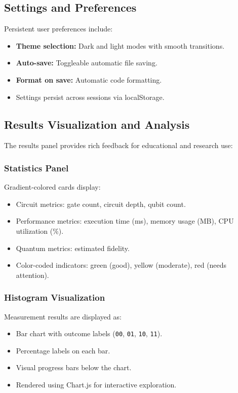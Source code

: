 \documentclass[conference]{IEEEtran}
\begin{document}
\subsection{Settings and Preferences}

Persistent user preferences include:
\begin{itemize}
    \item \textbf{Theme selection:} Dark and light modes with smooth transitions.
    \item \textbf{Auto-save:} Toggleable automatic file saving.
    \item \textbf{Format on save:} Automatic code formatting.
    \item Settings persist across sessions via localStorage.
\end{itemize}

\subsection{Results Visualization and Analysis}

The results panel provides rich feedback for educational and research use:

\subsubsection{Statistics Panel}
Gradient-colored cards display:
\begin{itemize}
    \item Circuit metrics: gate count, circuit depth, qubit count.
    \item Performance metrics: execution time (ms), memory usage (MB), CPU utilization (\%).
    \item Quantum metrics: estimated fidelity.
    \item Color-coded indicators: green (good), yellow (moderate), red (needs attention).
\end{itemize}

\subsubsection{Histogram Visualization}
Measurement results are displayed as:
\begin{itemize}
    \item Bar chart with outcome labels (\texttt{00}, \texttt{01}, \texttt{10}, \texttt{11}).
    \item Percentage labels on each bar.
    \item Visual progress bars below the chart.
    \item Rendered using Chart.js for interactive exploration.
\end{itemize}
\end{document}
